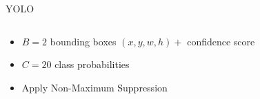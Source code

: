 \documentclass[10pt]{beamer}
\theoremstyle{remark}
\theoremstyle{definition}
\begin{document}
\begin{frame}{YOLO}
\begin{columns}
    \begin{column}{0.5\textwidth}
    \begin{itemize}
        \item<3-> $B=2$ bounding boxes $(x,y,w,h) + $ confidence score
        \item<4-> $C=20$ class probabilities
        \vspace{1cm}
        \item<8-> Apply Non-Maximum Suppression
    \end{itemize}
    \end{column}
    
    \begin{column}{0.5\textwidth}


\end{column}
\end{columns}
\end{frame}
\end{document}
